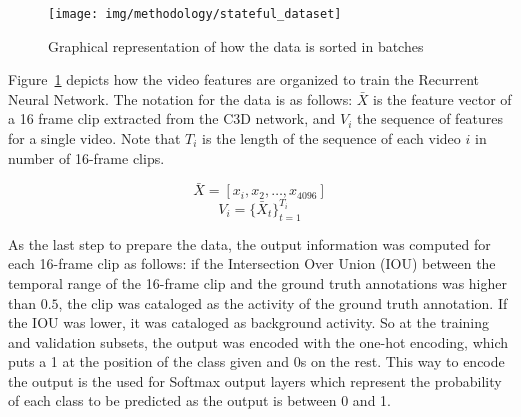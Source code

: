 \begin{figure}[ht]
\begin{center}
\texttt{[image: img/methodology/stateful\_dataset]}
\end{center}
\caption{Graphical representation of how the data is sorted in batches}
\label{fig:stateful_dataset}
\end{figure}

Figure~\ref{fig:stateful_dataset} depicts how the video features are organized to train the Recurrent Neural Network. The notation for the data is as follows: $\bar{X}$ is the feature vector of a 16 frame clip extracted from the C3D network, and $V_i$ the sequence of features for a single video. Note that $T_i$ is the length of the sequence of each video $i$ in number of 16-frame clips.

\begin{equation}
	\bar{X} = [x_i, x_2, \ldots, x_{4096}]
\end{equation}
\begin{equation}
	V_i = \{ \bar{X}_t \}_{t=1}^{T_i}
\end{equation}


As the last step to prepare the data, the output information was computed for each 16-frame clip as follows: if the Intersection Over Union (IOU) between the temporal range of the 16-frame clip and the ground truth annotations was higher than $0.5$, the clip was cataloged as the activity of the ground truth annotation. If the IOU was lower, it was cataloged as background activity. So at the training and validation subsets, the output was encoded with the one-hot encoding, which puts a 1 at the position of the class given and 0s on the rest. This way to encode the output is the used for Softmax output layers which represent the probability of each class to be predicted as the output is between 0 and 1.



